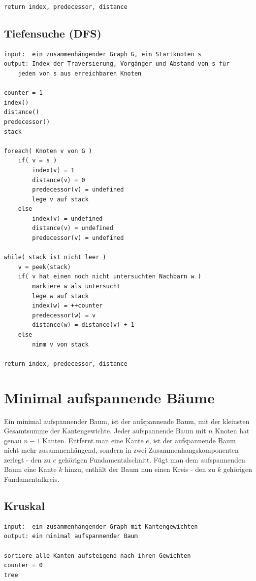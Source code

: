 \documentclass[10pt,a4paper,landscape]{article}
\begin{document}
\begin{multicols*}{2}
\begin{verbatim}
return index, predecessor, distance
    \end{verbatim}
\normalsize
    
    \subsection{ Tiefensuche (DFS) }
    \small
\begin{verbatim}
input:  ein zusammenhängender Graph G, ein Startknoten s
output: Index der Traversierung, Vorgänger und Abstand von s für 
    jeden von s aus erreichbaren Knoten

counter = 1
index()
distance()
predecessor()
stack

foreach( Knoten v von G )
    if( v = s )
        index(v) = 1
        distance(v) = 0
        predecessor(v) = undefined
        lege v auf stack
    else
        index(v) = undefined
        distance(v) = undefined
        predecessor(v) = undefined

while( stack ist nicht leer )
    v = peek(stack)
    if( v hat einen noch nicht untersuchten Nachbarn w )
        markiere w als untersucht
        lege w auf stack
        index(w) = ++counter
        predecessor(w) = v
        distance(w) = distance(v) + 1
    else
        nimm v von stack

return index, predecessor, distance
    \end{verbatim}
\normalsize


\section{ Minimal aufspannende Bäume }
    Ein minimal aufspannender Baum, ist der aufspannende Baum, mit der kleinsten Gesamtsumme der Kantengewichte.
    Jeder aufspannende Baum mit $n$ Knoten hat genau $n-1$ Kanten. Entfernt man eine Kante $e$, ist der 
    aufspannende Baum nicht mehr zusammenhängend, sondern in zwei Zusammenhangskomponenten zerlegt - den zu $e$ 
    gehörigen Fundamentalschnitt. Fügt man dem aufspannenden Baum eine Kante $k$ hinzu, enthält der Baum nun 
    einen Kreis - den zu $k$ gehörigen Fundamentalkreis.
    \subsection{ Kruskal }
    \small
\begin{verbatim}
input:  ein zusammenhängender Graph mit Kantengewichten
output: ein minimal aufspannender Baum

sortiere alle Kanten aufsteigend nach ihren Gewichten
counter = 0
tree


\end{verbatim}
\end{multicols*}
\end{document}
